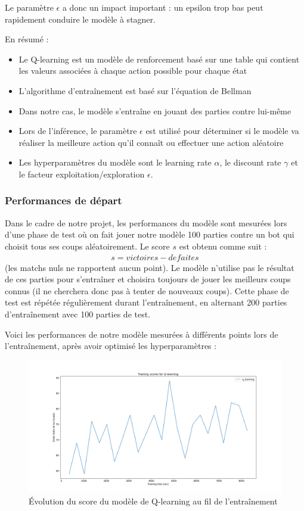 \documentclass[french]{article}
\begin{document}
    Le paramètre $\epsilon$ a donc un impact important : un epsilon trop bas peut rapidement conduire le modèle à stagner.

    En résumé :
    \begin{itemize}
        \item Le Q-learning est un modèle de renforcement basé sur une table qui contient les valeurs associées à chaque action possible pour chaque état
        \item L'algorithme d'entraînement est basé sur l'équation de Bellman
        \item Dans notre cas, le modèle s'entraîne en jouant des parties contre lui-même
        \item Lors de l'inférence, le paramètre $\epsilon$ est utilisé pour déterminer si le modèle va réaliser la meilleure action qu'il connaît ou effectuer une action aléatoire
        \item Les hyperparamètres du modèle sont le learning rate $\alpha$, le discount rate $\gamma$ et le facteur exploitation/exploration $\epsilon$.
    \end{itemize}


    \subsubsection{Performances de départ}

    Dans le cadre de notre projet, les performances du modèle sont mesurées lors d'une phase de test où on fait jouer notre modèle 100 parties contre un bot qui choisit tous ses coups aléatoirement. Le score $s$ est obtenu comme suit : 
    \begin{align*} 
        s = victoires - defaites
    \end{align*} 
    (les matchs nuls ne rapportent aucun point). Le modèle n'utilise pas le résultat de ces parties pour s'entraîner et choisira toujours de jouer les meilleurs coups connus (il ne cherchera donc pas à tenter de nouveaux coups). Cette phase de test est répétée régulièrement durant l'entraînement, en alternant 200 parties d'entraînement avec 100 parties de test.
    
    Voici les performances de notre modèle mesurées à différents points lors de l'entraînement, après avoir optimisé les hyperparamètres :

    \begin{figure}[h]
        \includegraphics[width=12cm]{q_learning_metrics}
        \centering
        \caption{Évolution du score du modèle de Q-learning au fil de l'entraînement}
        \centering
    \end{figure}
\end{document}
